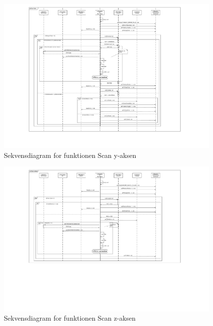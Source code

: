 \begin{figure}[H]
	\caption{Sekvensdiagram for funktionen Scan y-aksen}
	\label{SD:PSoC:ScanY}
	\includegraphics[scale=0.29,trim=200 100 0 0,clip]{APPSoC/SD-Scan-y-aksen}
\end{figure}

\begin{figure}[H]
	\caption{Sekvensdiagram for funktionen Scan z-aksen}
	\label{SD:PSoC:ScanZ}
	\includegraphics[scale=0.29,trim=200 100 0 0, clip]{APPSoC/SD-Scan-z-aksen}
\end{figure}